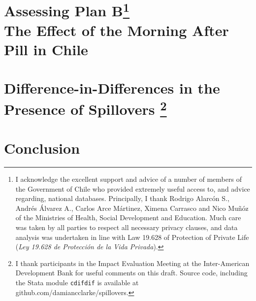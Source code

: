 \documentclass{report}[12pt]
\newcommand{\twinloc}{./twins}
\newcommand{\pillloc}{./planB}
\newcommand{\sdidloc}{./spillovers}
\let\stdsection\thesection
\let\oldchapter\chapter
\renewcommand{\chapter}{\let\thesection\stdsection\oldchapter}
\begin{document}
\begin{spacing}{1.4}



\setlength\parindent{0.25in}
\setlength\parskip{0.25in}
\renewcommand*{\thefootnote}{\fnsymbol{footnote}}

\chapter[Assessing Plan B: The Effect of the Morning After Pill in Chile]{Assessing 
Plan B\footnote{I acknowledge
the excellent support and advice of a number of members of the Government of Chile 
who provided extremely useful access to, and advice regarding, national databases.  
Principally, I thank Rodrigo Alarc\'on S., Andr\'es \'Alvarez A., Carlos Arce 
M\'artinez, Ximena Carrasco and Nico Mu\~n\'oz of the Ministries of Health, Social 
Development and Education.  Much care was taken by all parties to respect all 
necessary privacy clauses, and data analysis was undertaken in line with Law 
19.628 of Protection of Private Life 
(\emph{Ley 19.628 de Protecci\'on de la Vida Privada}).} 
\\[2ex]\Large  The Effect of the Morning After Pill in Chile}
\label{chap:pill}
\renewcommand*{\thefootnote}{\arabic{footnote}}




\setlength\parindent{0.25in}
\setlength\parskip{0.25in}
\renewcommand*{\thefootnote}{\fnsymbol{footnote}}
\chapter[Difference-in-Differences in the Presence of Spillovers]%
{Difference-in-Differences in the Presence of Spillovers%
\footnote{I thank participants in the Impact Evaluation Meeting at the 
Inter-American Development Bank for useful comments on this draft. Source code, 
including the Stata module \texttt{cdifdif} is available at 
github.com/damiancclarke/spillovers.}}
\label{chap:spill}
\renewcommand*{\thefootnote}{\arabic{footnote}}




\chapter*{Conclusion}

\end{spacing}
\newpage

\end{document}
